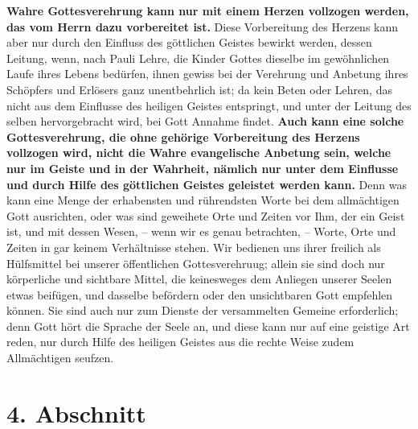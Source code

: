  \textbf{Wahre
Gottesverehrung kann nur mit einem Herzen vollzogen werden, das vom Herrn
dazu vorbereitet ist.} Diese Vorbereitung des Herzens kann aber nur
durch den Einfluss des göttlichen Geistes bewirkt werden, dessen Leitung, wenn,
nach Pauli Lehre, die Kinder Gottes dieselbe im gewöhnlichen Laufe ihres Lebens
bedürfen, ihnen gewiss bei der Verehrung und Anbetung ihres Schöpfers und
Erlösers ganz unentbehrlich ist; da kein Beten oder Lehren, das nicht aus dem
Einflusse des
heiligen Geistes entspringt, und unter der Leitung des selben hervorgebracht
wird, bei Gott Annahme findet. \textbf{Auch kann eine solche Gottesverehrung,
die ohne
gehörige Vorbereitung des Herzens vollzogen wird, nicht die Wahre evangelische
Anbetung sein, welche nur im Geiste und in der Wahrheit, nämlich nur unter dem
Einflusse und durch Hilfe des göttlichen Geistes geleistet werden
kann.} Denn was kann eine Menge der
erhabensten und rührendsten Worte bei dem
allmächtigen Gott ausrichten, oder was sind geweihete Orte und Zeiten vor
Ihm, der ein Geist ist, und mit dessen Wesen, -- wenn wir es genau betrachten,
-- Worte, Orte und Zeiten in gar keinem Verhältnisse stehen. Wir bedienen uns
ihrer freilich als Hülfsmittel bei unserer öffentlichen Gottesverehruug; allein
sie sind doch nur körperliche und sichtbare Mittel, die keinesweges dem Anliegen
unserer
Seelen etwas beifügen, und dasselbe befördern oder den unsichtbaren Gott
empfehlen können. Sie sind auch nur
zum Dienste der versammelten Gemeine erforderlich; denn
Gott hört die Sprache
der Seele an, und diese kann
nur auf eine geistige Art reden, nur durch
Hilfe des heiligen Geistes aus die
rechte Weise zudem Allmächtigen seufzen.

\section{4. Abschnitt} \label{kap6_ab4}

